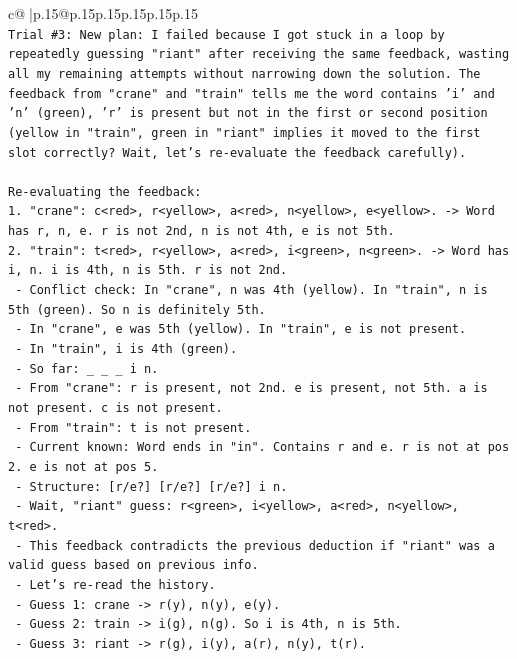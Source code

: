 \documentclass{article}
\begin{document}
{\begin{supertabular}{c@{$\;$}|p{.15\linewidth}@{}p{.15\linewidth}p{.15\linewidth}p{.15\linewidth}p{.15\linewidth}p{.15\linewidth}}
{{{\\ 
\texttt{Trial \#3: New plan: I failed because I got stuck in a loop by repeatedly guessing "riant" after receiving the same feedback, wasting all my remaining attempts without narrowing down the solution. The feedback from "crane" and "train" tells me the word contains 'i' and 'n' (green), 'r' is present but not in the first or second position (yellow in "train", green in "riant" implies it moved to the first slot correctly? Wait, let's re{-}evaluate the feedback carefully).} \\
\\ 
\texttt{Re{-}evaluating the feedback:} \\
\texttt{1. "crane": c<red>, r<yellow>, a<red>, n<yellow>, e<yellow>. {-}> Word has r, n, e. r is not 2nd, n is not 4th, e is not 5th.} \\
\texttt{2. "train": t<red>, r<yellow>, a<red>, i<green>, n<green>. {-}> Word has i, n. i is 4th, n is 5th. r is not 2nd.} \\
\texttt{   {-} Conflict check: In "crane", n was 4th (yellow). In "train", n is 5th (green). So n is definitely 5th.} \\
\texttt{   {-} In "crane", e was 5th (yellow). In "train", e is not present.} \\
\texttt{   {-} In "train", i is 4th (green).} \\
\texttt{   {-} So far: \_ \_ \_ i n.} \\
\texttt{   {-} From "crane": r is present, not 2nd. e is present, not 5th. a is not present. c is not present.} \\
\texttt{   {-} From "train": t is not present.} \\
\texttt{   {-} Current known: Word ends in "in". Contains r and e. r is not at pos 2. e is not at pos 5.} \\
\texttt{   {-} Structure: {[}r/e?{]} {[}r/e?{]} {[}r/e?{]} i n.} \\
\texttt{   {-} Wait, "riant" guess: r<green>, i<yellow>, a<red>, n<yellow>, t<red>.} \\
\texttt{     {-} This feedback contradicts the previous deduction if "riant" was a valid guess based on previous info.} \\
\texttt{     {-} Let's re{-}read the history.} \\
\texttt{     {-} Guess 1: crane {-}> r(y), n(y), e(y).} \\
\texttt{     {-} Guess 2: train {-}> i(g), n(g). So i is 4th, n is 5th.} \\
\texttt{     {-} Guess 3: riant {-}> r(g), i(y), a(r), n(y), t(r).} \\
}}}
\end{supertabular}}
\end{document}
